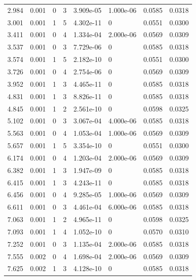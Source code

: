 \documentclass[preview]{standalone}
\begin{document}
{{\begin{tabular}{L{1.2cm}C{1.2cm} C{0.3cm}C{0.5cm} C{1.4cm}C{1.4cm} C{1.4cm}C{1.4cm}}
  2.984  &  0.001  & 0     &  3 &  3.909e-05  & 1.000e-06  & 0.0585 &  0.0318   \\ 
  3.001  &  0.001  & 1     &  5 &  4.302e-11  & 0  & 0.0551 &  0.0300   \\ 
  3.411  &  0.001  & 0     &  4 &  1.334e-04  & 2.000e-06  & 0.0569 &  0.0309   \\ 
  3.537  &  0.001  & 0     &  3 &  7.729e-06  & 0  & 0.0585 &  0.0318   \\ 
  3.574  &  0.001  & 1     &  5 &  2.182e-10  & 0  & 0.0551 &  0.0300   \\ 
  3.726  &  0.001  & 0     &  4 &  2.754e-06  & 0  & 0.0569 &  0.0309   \\ 
  3.952  &  0.001  & 1     &  3 &  4.465e-11  & 0  & 0.0585 &  0.0318   \\ 
  4.831  &  0.001  & 1     &  3 &  8.826e-11  & 0  & 0.0585 &  0.0318   \\ 
  4.845  &  0.001  & 1     &  2 &  2.561e-10  & 0  & 0.0598 &  0.0325   \\ 
  5.102  &  0.001  & 0     &  3 &  3.067e-04  & 4.000e-06  & 0.0585 &  0.0318   \\ 
  5.563  &  0.001  & 0     &  4 &  1.053e-04  & 1.000e-06  & 0.0569 &  0.0309   \\ 
  5.657  &  0.001  & 1     &  5 &  3.354e-10  & 0  & 0.0551 &  0.0300   \\ 
  6.174  &  0.001  & 0     &  4 &  1.203e-04  & 2.000e-06  & 0.0569 &  0.0309   \\ 
  6.382  &  0.001  & 1     &  3 &  1.947e-09  & 0  & 0.0585 &  0.0318   \\ 
  6.415  &  0.001  & 1     &  3 &  4.243e-11  & 0  & 0.0585 &  0.0318   \\ 
  6.456  &  0.001  & 0     &  4 &  9.285e-05  & 1.000e-06  & 0.0569 &  0.0309   \\ 
  6.611  &  0.001  & 0     &  3 &  4.461e-04  & 6.000e-06  & 0.0585 &  0.0318   \\ 
  7.063  &  0.001  & 1     &  2 &  4.965e-11  & 0  & 0.0598 &  0.0325   \\ 
  7.093  &  0.001  & 1     &  4 &  1.052e-10  & 0  & 0.0570 &  0.0310   \\ 
  7.252  &  0.001  & 0     &  3 &  1.135e-04  & 2.000e-06  & 0.0585 &  0.0318   \\ 
  7.555  &  0.002  & 0     &  4 &  1.698e-04  & 2.000e-06  & 0.0569 &  0.0309   \\ 
  7.625  &  0.002  & 1     &  3 &  4.128e-10  & 0  & 0.0585 &  0.0318   \\ 

\end{tabular}}}
\end{document}
